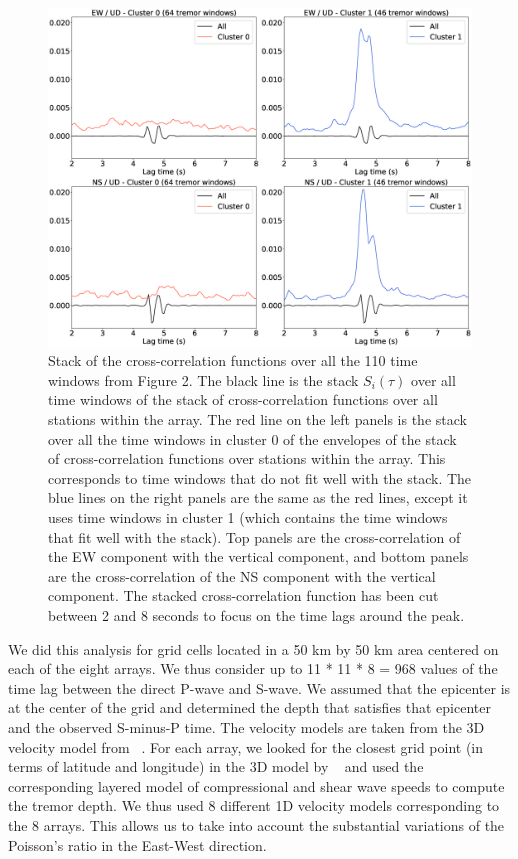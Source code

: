 \documentclass[draft]{agujournal2019}
\begin{document}
\begin{figure}
\noindent\includegraphics[width=\textwidth, trim={0cm 0cm 0cm 0cm},clip]{figures/BS_-05_-05_PWS_PWS_cluster_stackcc.eps}
\caption{Stack of the cross-correlation functions over all the 110 time windows from Figure 2. The black line is the stack $S_i (\tau)$ over all time windows of the stack of cross-correlation functions over all stations within the array. The red line on the left panels is the stack over all the time windows in cluster 0 of the envelopes of the stack of cross-correlation functions over stations within the array.  This corresponds to time windows that do not fit well with the stack. The blue lines on the right panels are the same as the red lines, except it uses time windows in cluster 1 (which contains the time windows that fit well with the stack). Top panels are the cross-correlation of the EW component with the vertical component, and bottom panels are the cross-correlation of the NS component with the vertical component. The stacked cross-correlation function has been cut between 2 and 8 seconds to focus on the time lags around the peak.}
\label{pngfiguresample}
\end{figure}

We did this analysis for grid cells located in a 50 km by 50 km area centered on each of the eight arrays. We thus consider up to 11 * 11 * 8 = 968 values of the time lag between the direct P-wave and S-wave. We assumed that the epicenter is at the center of the grid and determined the depth that satisfies that epicenter and the observed S-minus-P time. The velocity models are taken from the 3D velocity model from ~. For each array, we looked for the closest grid point (in terms of latitude and longitude) in the 3D model by ~ and used the corresponding layered model of compressional and shear wave speeds to compute the tremor depth. We thus used 8 different 1D velocity models corresponding to the 8 arrays. This allows us to take into account the substantial variations of the Poisson's ratio in the East-West direction.
\end{document}
